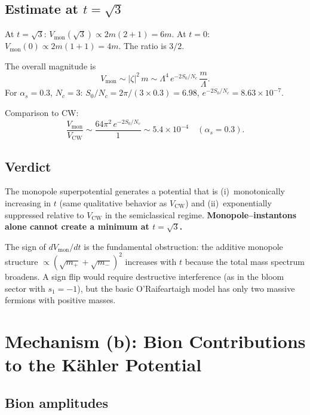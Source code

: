 \subsection{Estimate at $t = \sqrt{3}$}

At $t = \sqrt{3}$: $V_{\text{mon}}(\sqrt{3}) \propto 2m(2+1) = 6m$.
At $t = 0$: $V_{\text{mon}}(0) \propto 2m(1+1) = 4m$.
The ratio is $3/2$.

The overall magnitude is
\begin{equation}
V_{\text{mon}} \sim |\zeta|^2\,m \sim \Lambda^4\,e^{-2S_0/N_c}\,\frac{m}{\Lambda}.
\end{equation}
For $\alpha_s = 0.3$, $N_c = 3$:
$S_0/N_c = 2\pi/(3 \times 0.3) = 6.98$, $e^{-2S_0/N_c} = 8.63 \times 10^{-7}$.

Comparison to CW:
\begin{equation}
\frac{V_{\text{mon}}}{V_{\text{CW}}} \sim \frac{64\pi^2\,e^{-2S_0/N_c}}{1}
\sim 5.4 \times 10^{-4} \quad (\alpha_s = 0.3).
\end{equation}

\subsection{Verdict}

The monopole superpotential generates a potential that is (i)~monotonically increasing
in $t$ (same qualitative behavior as $V_{\text{CW}}$) and (ii)~exponentially suppressed
relative to $V_{\text{CW}}$ in the semiclassical regime.
\textbf{Monopole--instantons alone cannot create a minimum at $t = \sqrt{3}$.}

The sign of $dV_{\text{mon}}/dt$ is the fundamental obstruction:
the additive monopole structure $\propto (\sqrt{m_+} + \sqrt{m_-})^2$ increases with $t$
because the total mass spectrum broadens.
A sign flip would require destructive interference (as in the bloom sector with
$s_1 = -1$), but the basic O'Raifeartaigh model has only two massive fermions with positive masses.


\section{Mechanism (b): Bion Contributions to the K\"ahler Potential}

\subsection{Bion amplitudes}

